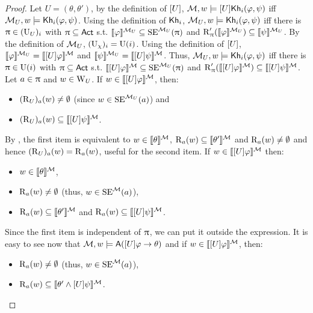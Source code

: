 \begin{proof}
	Let $U = (\theta,\theta')$, by the definition of $[U]$, $\mathcal{M},w \models [U]{\sf Kh}_i(\varphi,\psi)$ iff $\mathcal{M}_{{U}},w \models {\sf Kh}_i(\varphi,\psi)$.
	Using the definition of ${\sf Kh}_i$, $\mathcal{M}_{{U}},w \models {\sf Kh}_i(\varphi,\psi)$ iff there is $\uppi \in (\operatorname{U}_{{U}})_i$ with $\uppi \subseteq {\rm \sf Act}$ s.t. $\llbracket \varphi \rrbracket^{\mathcal{M}_{{U}}} \subseteq \operatorname{SE}^{\mathcal{M}_{{U}}}(\uppi)$ and $\operatorname{R}'_\uppi(\llbracket \varphi \rrbracket^{\mathcal{M}_{{U}}}) \subseteq \llbracket \psi \rrbracket^{\mathcal{M}_{{U}}}$.
	By the definition of $\mathcal{M}_{{U}}$, $(\operatorname{U}_{{\chi}})_i=\operatorname{U}(i)$. Using the definition of $[U]$, $\llbracket \varphi \rrbracket^{\mathcal{M}_{{U}}} = \llbracket [U]\varphi \rrbracket^{\mathcal{M}}$ and $\llbracket \psi \rrbracket^{\mathcal{M}_{{U}}} = \llbracket [U]\psi \rrbracket^{\mathcal{M}}$.
	Thus, $\mathcal{M}_{{U}},w \models {\sf Kh}_i(\varphi,\psi)$ iff there is $\uppi \in \operatorname{U}(i)$ with $\uppi \subseteq {\rm \sf Act}$ s.t. $\llbracket [U]\varphi \rrbracket^{\mathcal{M}} \subseteq \operatorname{SE}^{\mathcal{M}_{{U}}}(\uppi)$ and $\operatorname{R}'_\uppi(\llbracket [U]\varphi \rrbracket^{\mathcal{M}}) \subseteq \llbracket [U]\psi \rrbracket^{\mathcal{M}}$.
	Let $a \in \uppi$ and $w \in \operatorname{W}_{{U}}$. If $w \in \llbracket [U]\varphi \rrbracket^{\mathcal{M}}$, then:
	\begin{itemize}
	\item $(\operatorname{R}_{{U}})_a(w) \neq \emptyset$ (since $w \in \operatorname{SE}^{\mathcal{M}_{{U}}}(a)$) and
	\item $(\operatorname{R}_{{U}})_a(w) \subseteq \llbracket [U]\psi \rrbracket^{\mathcal{M}}$.
	\end{itemize}
	By , the first item is equivalent to $w \in \llbracket \theta \rrbracket^{\mathcal{M}}$, $\operatorname{R}_a(w) \subseteq \llbracket \theta' \rrbracket^{\mathcal{M}}$ and $\operatorname{R}_a(w) \neq \emptyset$ and hence $(\operatorname{R}_{{U}})_a(w) = \operatorname{R}_a(w)$, useful for the second item.
	If $w \in \llbracket [U]\varphi \rrbracket^{\mathcal{M}}$ then:
	\begin{itemize}
	\item $w \in \llbracket \theta \rrbracket^{\mathcal{M}}$,
	\item $\operatorname{R}_a(w) \neq \emptyset$ (thus, $w \in \operatorname{SE}^{\mathcal{M}}(a)$),
	\item $\operatorname{R}_a(w) \subseteq \llbracket \theta' \rrbracket^{\mathcal{M}}$ and $\operatorname{R}_a(w) \subseteq \llbracket [U]\psi \rrbracket^{\mathcal{M}}$.
	\end{itemize}
	Since the first item is independent of $\uppi$, we can put it outside the expression.
	It is easy to see now that $\mathcal{M},w \models {\sf A}([U]\varphi \rightarrow \theta)$ and if $w \in \llbracket [U]\varphi \rrbracket^{\mathcal{M}}$, then:
	\begin{itemize}
	\item $\operatorname{R}_a(w) \neq \emptyset$ (thus, $w \in \operatorname{SE}^{\mathcal{M}}(a)$),
	\item $\operatorname{R}_a(w) \subseteq \llbracket \theta' \wedge [U]\psi \rrbracket^{\mathcal{M}}$.
	\end{itemize}
	

\end{proof}

